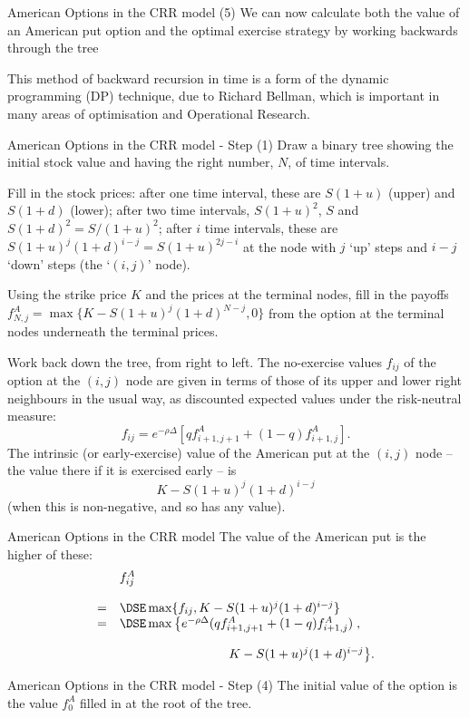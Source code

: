 American Options in the CRR model (5)
	We can now calculate both the value of an American put option and
	the optimal exercise strategy by working backwards through the
	tree
	
	This method of backward recursion in time is a form of the
	dynamic programming (DP) technique, \label{dynamic programming}
	due to Richard Bellman, which is important in many areas of
	optimisation and Operational Research.


American Options in the CRR model - Step (1)
	Draw a binary tree showing the initial stock value and having the
	right number, $N$, of time intervals.
	
	Fill in the stock prices: after one time interval, these are
	$S(1+u)$ (upper) and $S(1+d)$ (lower); after two time intervals,
	$S(1+u)^2$, $S$ and $ S(1+d)^2 = S/(1+u)^2$; after $i$ time
	intervals, these are $S(1+u)^j (1+d)^{i-j} = S (1+u)^{2j- i}$ at
	the node with
	$j$ `up' steps and $i-j$ `down' steps (the `$(i,j)$' node).
	
	Using the strike price $K$ and the prices at the terminal
	nodes, fill in the payoffs $f^A_{N,j} = \max\{K - S (1+u)^j
	(1+d)^{N-j}, 0\}$ from the option
	at the terminal nodes underneath the terminal prices.
	
	Work back down the tree, from right to left. The no-exercise
	values $f_{ij}$ of the option at the $(i,j)$ node are given in
	terms of those of its upper and lower right neighbours in the
	usual way, as discounted expected values under the risk-neutral
	measure:
		$$
		f_{ij} = e^{-\rho \Delta } [q f^A_{i+1,j+1} + (1 - q)
		f^A_{i+1,j}].
		$$
	The intrinsic (or early-exercise) value of the American put at the
	$(i,j)$ node -- the value there if it is exercised early -- is
		$$
		K - S (1+u)^j (1+d)^{i-j}
		$$
	(when this is non-negative, and so has any value).


American Options in the CRR model 
	The value of the American put is the higher of these:
		$$
		\begin{array}{ll}
			&f^A_{ij} \\*[12pt]=&\DSE \max\{f_{ij}, K - S (1+u)^j (1+d)^{i-j}\}\\
			=&\DSE \max\left\{e^{-\rho \Delta} (q f^A_{i+1,j+1} + (1 - q)
			f^A_{i+1,j})\right.,\\*[12pt]
			&\hspace{3cm} \left. K - S (1+u)^j (1+d)^{i-j}\right\}\!.
		\end{array}
		$$


American Options in the CRR model - Step (4)
	The initial value of the option is the value $f^A_0$ filled in
	at the root of the tree.
  

